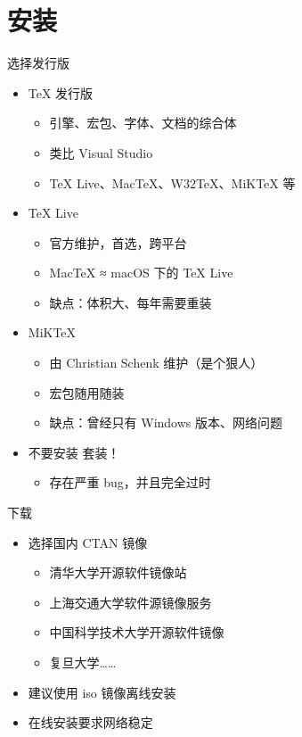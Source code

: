 \section{安装}

\begin{frame}{选择发行版}
\begin{itemize}
  \item \TeX{} 发行版
    \begin{itemize}
      \item 引擎、宏包、字体、文档的综合体
      \item 类比 Visual Studio
      \item \TeX{} Live、Mac\TeX{}、W32\TeX{}、MiK\TeX{} 等
    \end{itemize}
  \item \TeX{} Live 
    \begin{itemize}
      \item 官方维护，首选，跨平台
      \item Mac\TeX{} ≈ macOS 下的 \TeX{} Live
      \item 缺点：体积大、每年需要重装
    \end{itemize}
  \item MiK\TeX{} 
    \begin{itemize}
      \item 由 Christian Schenk 维护（是个狠人）
      \item 宏包随用随装
      \item 缺点：曾经只有 Windows 版本、网络问题
    \end{itemize}
  \item \alert{不要安装 \CTeX{} 套装！}
    \begin{itemize}
      \item \alert{存在严重 bug，并且完全过时}
    \end{itemize}
\end{itemize}
\end{frame}

\begin{frame}{下载}
\begin{itemize}
  \item 选择国内 CTAN 镜像
    \begin{itemize}
      \item 清华大学开源软件镜像站 
      \item 上海交通大学软件源镜像服务 
      \item 中国科学技术大学开源软件镜像 
      \item 复旦大学……
    \end{itemize}
  \item 建议使用 iso 镜像离线安装
  \item 在线安装要求网络稳定
\end{itemize}
\end{frame}

